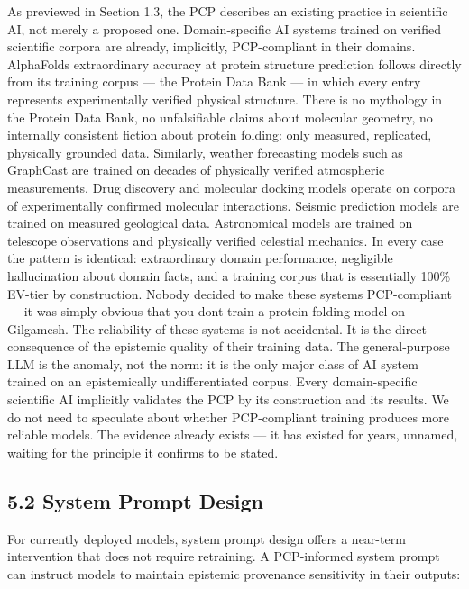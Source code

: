 \documentclass[
]{article}
\begin{document}
As previewed in Section 1.3, the PCP describes an existing practice in
scientific AI, not merely a proposed one. Domain-specific AI systems
trained on verified scientific corpora are already, implicitly,
PCP-compliant in their domains. AlphaFold\textquotesingle s
extraordinary accuracy at protein structure prediction follows directly
from its training corpus --- the Protein Data Bank --- in which every
entry represents experimentally verified physical structure. There is no
mythology in the Protein Data Bank, no unfalsifiable claims about
molecular geometry, no internally consistent fiction about protein
folding: only measured, replicated, physically grounded data. Similarly,
weather forecasting models such as GraphCast are trained on decades of
physically verified atmospheric measurements. Drug discovery and
molecular docking models operate on corpora of experimentally confirmed
molecular interactions. Seismic prediction models are trained on
measured geological data. Astronomical models are trained on telescope
observations and physically verified celestial mechanics. In every case
the pattern is identical: extraordinary domain performance, negligible
hallucination about domain facts, and a training corpus that is
essentially 100\% EV-tier by construction. Nobody decided to make these
systems PCP-compliant --- it was simply obvious that you
don\textquotesingle t train a protein folding model on Gilgamesh. The
reliability of these systems is not accidental. It is the direct
consequence of the epistemic quality of their training data. The
general-purpose LLM is the anomaly, not the norm: it is the only major
class of AI system trained on an epistemically undifferentiated corpus.
Every domain-specific scientific AI implicitly validates the PCP by its
construction and its results. We do not need to speculate about whether
PCP-compliant training produces more reliable models. The evidence
already exists --- it has existed for years, unnamed, waiting for the
principle it confirms to be stated.

\subsection{5.2 System Prompt Design}\label{system-prompt-design}

For currently deployed models, system prompt design offers a near-term
intervention that does not require retraining. A PCP-informed system
prompt can instruct models to maintain epistemic provenance sensitivity
in their outputs:
\end{document}
